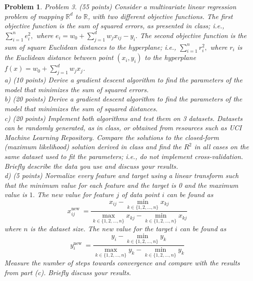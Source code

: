 \documentclass[8pt]{article}
\newtheorem{problem}{Problem}
\begin{document}
\begin{problem}
Problem 3. (55 points) Consider a multivariate linear regression problem of mapping $\mathbb{R}^{d}$ to $\mathbb{R}$, with two different objective functions. The first objective function is the sum of squared errors, as presented in class;
i.e., $\sum_{i=1}^{n} e_{i}^{2},$ where $e_{i}=w_{0}+\sum_{j=1}^{d} w_{j} x_{i j}-y_{i} .$ The second objective function is the sum of square Euclidean distances to the hyperplane; i.e., $\sum_{i=1}^{n} r_{i}^{2},$ where $r_{i}$ is the Euclidean distance between point $\left(x_{i}, y_{i}\right)$ to the hyperplane $f(x)=w_{0}+\sum_{j=1}^{d} w_{j} x_{j}$.\\

a) (10 points) Derive a gradient descent algorithm to find the parameters of the model that minimizes the sum of squared errors.\\

b) (20 points) Derive a gradient descent algorithm to find the parameters of the model that minimizes the sum of squared distances.\\

c) (20 points) Implement both algorithms and test them on 3 datasets. Datasets can be randomly generated, as in class, or obtained from resources such as UCI Machine Learning Repository. Compare the solutions to the closed-form (maximum likelihood) solution derived in class and find the $R^{2}$ in all cases on the same dataset used to fit the parameters; i.e., do not implement cross-validation. Briefly describe the data you use and discuss your results.\\

d) (5 points) Normalize every feature and target using a linear transform such that the minimum value for each feature and the target is 0 and the maximum value is $1 .$ The new value for feature $j$ of data point $i$ can be found as
$$
x_{i j}^{\text {new }}=\frac{x_{i j}-\min _{k \in\{1,2, \ldots, n\}} x_{k j}}{\max _{k \in\{1,2, \ldots, n\}} x_{k j}-\min _{k \in\{1,2, \ldots, n\}} x_{k j}}
$$
where $n$ is the dataset size. The new value for the target $i$ can be found as
$$
y_{i}^{\text {new }}=\frac{y_{i}-\min _{k \in\{1,2, \ldots, n\}} y_{k}}{\max _{k \in\{1,2, \ldots, n\}} y_{k}-\min _{k \in\{1,2, \ldots, n\}} y_{k}}
$$
Measure the number of steps towards convergence and compare with the results from part (c). Briefly discuss your results.
\end{problem}
\end{document}
